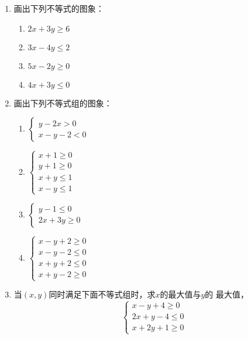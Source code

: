 
\begin{enumerate}
    \item 画出下列不等式的图象：
\begin{multicols}{2}
    \begin{enumerate}
        \item $2x+3y\ge 6$
        \item $3x-4y\le 2$
        \item $5x-2y\ge 0$
        \item $4x+3y\le 0$
    \end{enumerate}
\end{multicols}

 \item 画出下列不等式组的图象：
 \begin{multicols}{2}
    \begin{enumerate}
        \item $\begin{cases}
            y-2x>0\\x-y-2<0
        \end{cases}$
        \item $\begin{cases}
            x+1\ge 0\\y+1\ge 0\\x+y\le 1\\ x-y\le 1
        \end{cases}$
        \item $\begin{cases}
            y-1\le 0\\2x+3y\ge 0
        \end{cases}$
        
        \item $\begin{cases}
            x-y+2\ge 0\\x-y-2\le 0\\x+y+2\le 0\\x+y-2\ge 0
        \end{cases}$
    \end{enumerate}
\end{multicols}

\item 当$(x,y)$同时满足下面不等式组时，求$x$的最大值与$y$的
    最大值，
    \[\begin{cases}
     x-y+4\ge 0\\
2x+y-4\le 0\\
x+2y+1\ge 0       
    \end{cases}\]


\end{enumerate}
